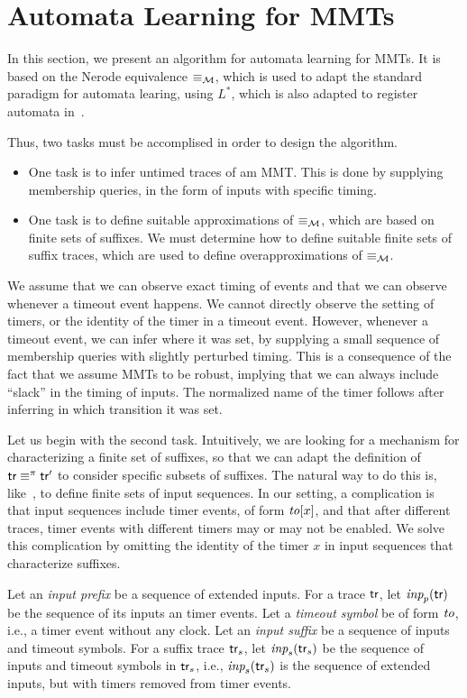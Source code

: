 \section{Automata Learning for MMTs}
In this section, we present an algorithm for automata learning for MMTs.
It is based on the Nerode equivalence $\equiv_{{\cal M}}$, which is used to adapt
the standard paradigm for automata learing, using $L^*$, which is also adapted
to register automata in~\cite{CasselHJS16}. 

Thus, two tasks must be accomplised in order to design the algorithm.
\begin{itemize}
  \item
    One task is to infer untimed traces of am MMT.
    This is done by supplying membership queries, in the form of inputs
    with specific timing.
\item
  One task is to define suitable approximations of $\equiv_{\cal M}$, which are
  based on finite sets of suffixes. We must determine how to define suitable
  finite sets of suffix traces, which are used to define overapproximations
  of $\equiv_{\cal M}$.
\end{itemize}
We assume that we can observe
exact timing of events and that we can observe whenever a timeout event
happens. We cannot directly observe the setting of timers, or the identity
of the timer in a timeout event. However, whenever a timeout event, we
can infer where it was set, by supplying a small sequence of membership queries
with slightly perturbed timing. This is a consequence of the fact that we
assume MMTs to be robust, implying that we can always include ``slack'' in
the timing of inputs. The normalized name of the timer follows after inferring
in which transition it was set.

Let us begin with the second task.
Intuitively, we are looking for a mechanism for characterizing a finite
set of suffixes, so that we can adapt the definition of
$\textsf{tr} \equiv^{\pi} \textsf{tr}'$ to consider specific subsets of
suffixes. The natural way to do this is, like~\cite{Nie03}, to define
finite sets of input sequences. In our setting, a complication is that
input sequences include timer events, of form $\mathit{to}[x]$, and that
after different traces, timer events with different timers may or may
not be enabled. We solve this complication by omitting the
identity of the timer $x$ in input sequences that characterize suffixes.

Let an \emph{input prefix} be a sequence of extended inputs.
For a trace $\textsf{tr}$, let $\textit{inp}_p(\textsf{tr})$ be the sequence of its
inputs an timer events.
Let a \emph{timeout symbol} be of form $\mathit{to}$, i.e., a
timer event without any clock.
Let an \emph{input suffix} be a sequence of inputs and timeout symbols.
For a suffix trace $\textsf{tr}_s$, let $\textit{inp}_s(\textsf{tr}_s)$ be the sequence
of inputs and timeout symbols in $\textsf{tr}_s$, i.e., $\textit{inp}_s(\textsf{tr}_s)$ is the
sequence of extended inputs, but with timers removed from timer events.

